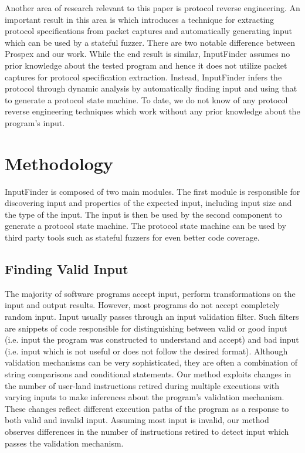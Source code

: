 \documentclass{acm_proc_article-sp}
\def \tool {InputFinder}
\begin{document}
Another area of research relevant to this paper is protocol reverse engineering.
An important result in this area is \cite{prospex} which introduces a technique for extracting protocol specifications from packet captures and automatically generating input which can be used by a stateful fuzzer.
There are two notable difference between Prospex and our work.
While the end result is similar, \tool{} assumes no prior knowledge about the tested program and hence it does not utilize packet captures for protocol specification extraction.
Instead, \tool{} infers the protocol through dynamic analysis by automatically finding input and using that to generate a protocol state machine.
To date, we do not know of any protocol reverse engineering techniques which work without any prior knowledge about the program's input.

\section{Methodology} \label{methodology}

\tool{} is composed of two main modules.
The first module is responsible for discovering input and properties of the expected input, including input size and the type of the input.
The input is then be used by the second component to generate a protocol state machine.
The protocol state machine can be used by third party tools such as stateful fuzzers for even better code coverage.
\subsection{Finding Valid Input}
The majority of software programs accept input, perform transformations on the input and output results.
However, most programs do not accept completely random input.
Input usually passes through an input validation filter.
Such filters are snippets of code responsible for distinguishing between valid or good input (i.e. input the program was constructed to understand and accept) and bad input (i.e. input which is not useful or does not follow the desired format).
Although validation mechanisms can be very sophisticated, they are often a combination of string comparisons and conditional statements.
Our method exploits changes in the number of user-land instructions retired during multiple executions with varying inputs to make inferences about the program's validation mechanism.
These changes reflect different execution paths of the program as a response to both valid and invalid input.
Assuming most input is invalid, our method observes differences in the number of instructions retired to detect input which passes the validation mechanism.
\end{document}
